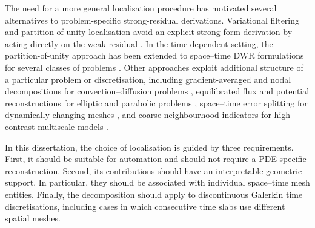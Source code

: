 The need for a more general localisation procedure has motivated several alternatives to problem-specific strong-residual derivations. Variational filtering and partition-of-unity localisation avoid an explicit strong-form derivation by acting directly on the weak residual \cite{BraackErn2003,Richter_Wick_2015}. 
In the time-dependent setting, the partition-of-unity approach has been extended to space--time DWR formulations for several classes of problems \cite{ThieleWick2024,R6,non-flow}.
Other approaches exploit additional structure of a particular problem or discretisation, including gradient-averaged and nodal decompositions for convection--diffusion problems \cite{KUZMIN20101674}, equilibrated flux and potential reconstructions for elliptic and parabolic problems \cite{MOZOLEVSKI2015127,CREUSE2023323}, space--time error splitting for dynamically changing meshes \cite{Schmich_Vexler_2008}, and coarse-neighbourhood indicators for high-contrast multiscale models \cite{CHUNG2016625}.

In this dissertation, the choice of localisation is guided by three requirements. 
First, it should be suitable for automation and should not require a PDE-specific reconstruction. Second, its contributions should have an interpretable geometric support. In particular, they should be associated with individual space--time mesh entities. Finally, the decomposition should apply to discontinuous Galerkin time discretisations, including cases in which consecutive time slabs use different spatial meshes.


